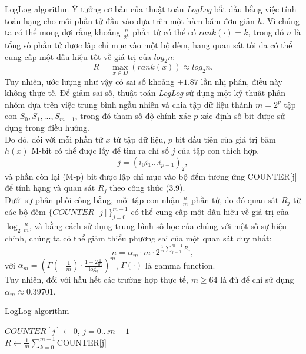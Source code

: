 \documentclass[10pt]{beamer}
\begin{document}
\begin{frame}{LogLog algorithm}
  Ý tưởng cơ bản của thuật toán \textit{LogLog} bắt đầu bằng việc tính toán hạng 
  cho mỗi phần tử đầu vào dựa trên một hàm băm đơn giản $h$. Vì chúng ta 
  có thể mong đợi rằng khoảng $\frac{n}{2^k}$ phần tử có thể có $rank(\cdot) = k$, 
  trong đó $n$ là tổng số phần tử được lập chỉ mục vào một bộ đếm, 
  hạng quan sát tối đa có thể cung cấp một dấu hiệu tốt về giá trị của $log_2n$:
  \[R = \underset{x \in D}{\max}\left(rank(x)\right) \approx log_2n.\]
  Tuy nhiên, ước lượng như vậy có sai số khoảng $\pm1.87$ lần nhị phân, điều này 
  không thực tế. Để giảm sai số, thuật toán \textit{LogLog} sử dụng 
  một kỹ thuật phân nhóm dựa trên việc trung bình ngẫu nhiên và chia tập dữ liệu 
  thành $m = 2^p$ tập con $S_0, S_1,..., S_{m-1}$, trong đó tham số độ chính xác 
  $p$ xác định số bit được sử dụng trong điều hướng.\\
  Do đó, đối với mỗi phần tử $x$ từ tập dữ liệu, $p$ bit đầu tiên của giá trị 
  băm $h(x)$ M-bit có thể được lấy để tìm ra chỉ số $j$ của tập con thích hợp.
  \[j = \left(i_0i_1...i_{p-1}\right)_2,\]
  và phần còn lại (M-p) bit được lập chỉ mục vào bộ đếm tương ứng COUNTER[j] để 
  tính hạng và quan sát $R_j$ theo công thức (3.9).\\
  Dưới sự phân phối công bằng, mỗi tập con nhận $\frac{n}{m}$ phần tử, do đó quan sát 
  $R_j$ từ các bộ đếm $\{COUNTER[j]\}_{j=0}^{m-1}$ có thể cung cấp 
  một dấu hiệu về giá trị của $\log_2{\frac{n}{m}}$, và bằng cách sử dụng trung bình 
  số học của chúng với một số sự hiệu chỉnh, chúng ta có thể giảm thiểu phương sai 
  của một quan sát duy nhất:
  \[
      n = \alpha_m \cdot m \cdot 2 ^{\frac{1}{m}\sum\limits_{j=0}^{m-1}R_j},
  \]
  với $\alpha_m = \left(\Gamma\left(-\frac{1}{m}\right)\cdot \frac{1-2\frac{1}{m}}{\log_2}\right)^m$, $\Gamma(\cdot)$ là gamma function.\\ 
  Tuy nhiên, đối với hầu hết các trường hợp thực tế, $m \geq 64$ là đủ để chỉ sử dụng 
  $\alpha_m \approx 0.39701$.
\end{frame}
\begin{frame}{LogLog algorithm}
  \begin{algorithm}[H]
    \vspace{0.25cm}
    \DontPrintSemicolon
    \LinesNumberedHidden
    \caption[]{Estimatin cardinality with \textit{LogLog}}
    $COUNTER[j] \gets $0, $j = 0...m - 1$\\
    $R \gets \frac{1}{m} \sum\limits_{k=0}^{m-1}$COUNTER[j] \\
    \vspace{0.25cm}
\end{algorithm}
\end{frame}
\end{document}
